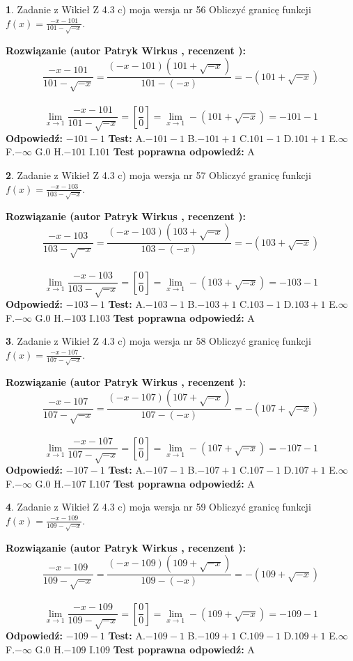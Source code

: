 \documentclass[12pt, a4paper]{article}
\theoremstyle{definition} %
\newtheorem{zad}{}
\newcommand{\zadStart}[1]{\begin{zad}#1\newline}
\newcommand{\zadStop}{\end{zad}}
\newcommand{\rozwStart}[2]{\noindent \textbf{Rozwiązanie (autor #1 , recenzent #2): }\newline}
\newcommand{\rozwStop}{\newline}
\newcommand{\odpStart}{\noindent \textbf{Odpowiedź:}\newline}
\newcommand{\odpStop}{\newline}
\newcommand{\testStart}{\noindent \textbf{Test:}\newline}
\newcommand{\testStop}{\newline}
\newcommand{\kluczStart}{\noindent \textbf{Test poprawna odpowiedź:}\newline}
\newcommand{\kluczStop}{\newline}
\begin{document}
\zadStart{Zadanie z Wikieł Z 4.3 c) moja wersja nr 56}
Obliczyć granicę funkcji $f(x)=\frac{-x-101}{101-\sqrt{-x}}$.
\zadStop
\rozwStart{Patryk Wirkus}{}
$$\frac{-x-101}{101-\sqrt{-x}}=\frac{(-x-101)(101+\sqrt{-x})}{101-(-x)}=-(101+\sqrt{-x})$$
\\
$$\lim\limits_{x\to1}\frac{-x-101}{101-\sqrt{-x}}=[\frac{0}{0}]=\lim\limits_{x\to1}-(101+\sqrt{-x}) =-101-1$$
\rozwStop
\odpStart
$-101-1$
\odpStop
\testStart
A.$-101-1$
B.$-101+1$
C.$101-1$
D.$101+1$
E.$\infty$
F.$-\infty$
G.$0$
H.$-101$
I.$101$
\testStop
\kluczStart
A
\kluczStop



\zadStart{Zadanie z Wikieł Z 4.3 c) moja wersja nr 57}
Obliczyć granicę funkcji $f(x)=\frac{-x-103}{103-\sqrt{-x}}$.
\zadStop
\rozwStart{Patryk Wirkus}{}
$$\frac{-x-103}{103-\sqrt{-x}}=\frac{(-x-103)(103+\sqrt{-x})}{103-(-x)}=-(103+\sqrt{-x})$$
\\
$$\lim\limits_{x\to1}\frac{-x-103}{103-\sqrt{-x}}=[\frac{0}{0}]=\lim\limits_{x\to1}-(103+\sqrt{-x}) =-103-1$$
\rozwStop
\odpStart
$-103-1$
\odpStop
\testStart
A.$-103-1$
B.$-103+1$
C.$103-1$
D.$103+1$
E.$\infty$
F.$-\infty$
G.$0$
H.$-103$
I.$103$
\testStop
\kluczStart
A
\kluczStop



\zadStart{Zadanie z Wikieł Z 4.3 c) moja wersja nr 58}
Obliczyć granicę funkcji $f(x)=\frac{-x-107}{107-\sqrt{-x}}$.
\zadStop
\rozwStart{Patryk Wirkus}{}
$$\frac{-x-107}{107-\sqrt{-x}}=\frac{(-x-107)(107+\sqrt{-x})}{107-(-x)}=-(107+\sqrt{-x})$$
\\
$$\lim\limits_{x\to1}\frac{-x-107}{107-\sqrt{-x}}=[\frac{0}{0}]=\lim\limits_{x\to1}-(107+\sqrt{-x}) =-107-1$$
\rozwStop
\odpStart
$-107-1$
\odpStop
\testStart
A.$-107-1$
B.$-107+1$
C.$107-1$
D.$107+1$
E.$\infty$
F.$-\infty$
G.$0$
H.$-107$
I.$107$
\testStop
\kluczStart
A
\kluczStop



\zadStart{Zadanie z Wikieł Z 4.3 c) moja wersja nr 59}
Obliczyć granicę funkcji $f(x)=\frac{-x-109}{109-\sqrt{-x}}$.
\zadStop
\rozwStart{Patryk Wirkus}{}
$$\frac{-x-109}{109-\sqrt{-x}}=\frac{(-x-109)(109+\sqrt{-x})}{109-(-x)}=-(109+\sqrt{-x})$$
\\
$$\lim\limits_{x\to1}\frac{-x-109}{109-\sqrt{-x}}=[\frac{0}{0}]=\lim\limits_{x\to1}-(109+\sqrt{-x}) =-109-1$$
\rozwStop
\odpStart
$-109-1$
\odpStop
\testStart
A.$-109-1$
B.$-109+1$
C.$109-1$
D.$109+1$
E.$\infty$
F.$-\infty$
G.$0$
H.$-109$
I.$109$
\testStop
\kluczStart
A
\kluczStop
\end{document}
